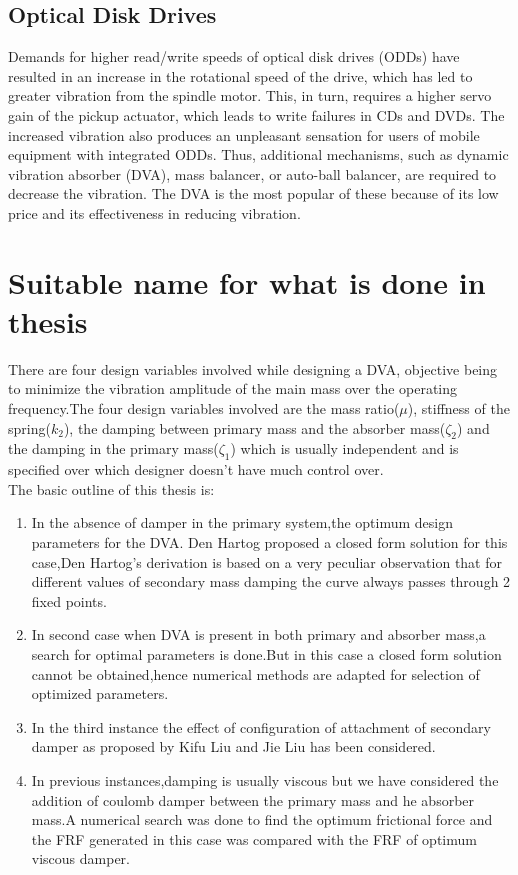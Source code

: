 \subsection{Optical Disk Drives}
Demands for higher read/write speeds of optical disk drives (ODDs) have resulted in an increase in the rotational speed of the drive, which has led to greater vibration from the spindle motor. This, in turn, requires a higher servo gain of the pickup actuator, which leads to write failures in CDs and DVDs. The increased vibration also produces an unpleasant sensation for users of mobile equipment with integrated ODDs. Thus, additional mechanisms, such as dynamic vibration absorber (DVA), mass balancer, or auto-ball balancer, are required to decrease the vibration. The DVA is the most popular of these because of its low price and its effectiveness in reducing vibration.

\section{Suitable name for what is done in thesis}
There are four design variables involved while designing a DVA, objective being to minimize the vibration amplitude of the main mass over the operating frequency.The four design variables involved are the mass ratio($\mu$), stiffness of the spring($k_2$), the damping between primary mass and the absorber mass($\zeta_2$) and the damping in the primary mass($\zeta_1$) which is usually independent and is specified over which designer doesn't have much control over.\\

The basic outline of this thesis is:
\begin{enumerate}[1.]
\item In the absence of damper in the primary system,the optimum design parameters for the DVA. Den Hartog proposed a closed form solution for this case,Den Hartog’s derivation is based on a very peculiar observation that for different values of secondary mass damping the curve always passes through 2 fixed points.
\item In second case when DVA is present in both primary and absorber mass,a search for optimal parameters is done.But in this case a closed form solution cannot be obtained,hence numerical methods are adapted for selection of optimized parameters.
\item In the third instance the effect of configuration of attachment of secondary damper as proposed by Kifu Liu and Jie Liu has been considered.
\item In previous instances,damping is usually viscous but we have considered the addition of coulomb damper between the primary mass and he absorber mass.A numerical search was done to find the optimum frictional force and the FRF generated in this case was compared with the FRF of optimum viscous damper. 
\end{enumerate}

%
                       
